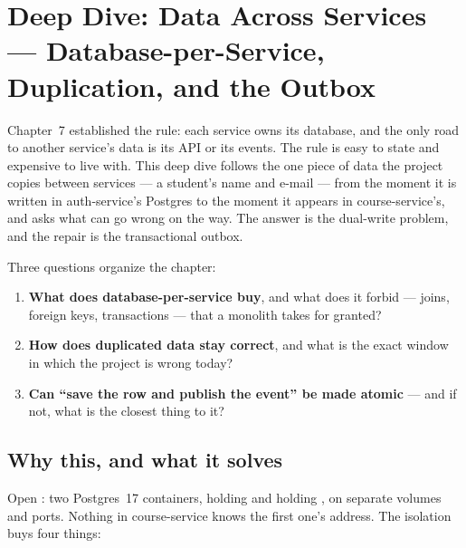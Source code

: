 \chapter{Deep Dive: Data Across Services --- Database-per-Service, Duplication, and the Outbox}
\label{ch:dd-consistency}

Chapter~7 established the rule: each service owns its database, and the
only road to another service's data is its API or its events. The rule
is easy to state and expensive to live with. This deep dive follows the
one piece of data the project copies between services --- a student's
name and e-mail --- from the moment it is written in auth-service's
Postgres to the moment it appears in course-service's, and asks what can
go wrong on the way. The answer is the dual-write problem, and the
repair is the transactional outbox.

Three questions organize the chapter:

\begin{enumerate}
  \item \textbf{What does database-per-service buy}, and what does it
  forbid --- joins, foreign keys, transactions --- that a monolith takes
  for granted?
  \item \textbf{How does duplicated data stay correct}, and what is the
  exact window in which the project is wrong today?
  \item \textbf{Can ``save the row and publish the event'' be made
  atomic} --- and if not, what is the closest thing to it?
\end{enumerate}

\section{Why this, and what it solves}

Open : two Postgres~17 containers,
 holding  and 
holding , on separate volumes and ports. Nothing in
course-service knows the first one's address. The isolation buys four
things:

